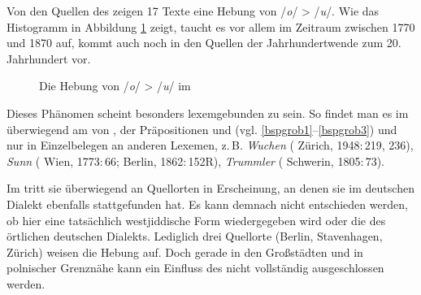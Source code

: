 Von den Quellen des  zeigen 17 Texte eine Hebung von /\textit{o}/ > /\textit{u}/. Wie das Histogramm in Abbildung \ref{histoo_u} zeigt, taucht es vor allem im Zeitraum zwischen 1770 und 1870 auf, kommt auch noch in den Quellen der Jahrhundertwende zum 20. Jahrhundert vor. \\

	
\begin{figure}[h!]
	\caption{Die Hebung von /\textit{o}/ > /\textit{u}/ im }
	\label{histoo_u}	
\end{figure}
\FloatBarrier


Dieses Phänomen scheint besonders lexemgebunden zu sein. So findet man es im  überwiegend am  von , der Präpositionen  und  (vgl. \ref{bspgrob1}--\ref{bspgrob3}) und nur in Einzelbelegen an anderen Lexemen, z.\,B. \textit{Wuchen}  ( Zürich, 1948:\,219, 236), \textit{Sunn}  ( Wien, 1773:\,66;  Berlin, 1862:\,152R), \textit{Trummler}  ( Schwerin, 1805:\,73). 

Im  tritt sie überwiegend an Quellorten in Erscheinung, an denen sie im deutschen Dialekt ebenfalls stattgefunden hat. Es kann demnach nicht entschieden werden, ob hier eine tatsächlich westjiddische Form wiedergegeben wird oder die des örtlichen deutschen Dialekts. Lediglich drei Quellorte (Berlin, Stavenhagen, Zürich) weisen die Hebung auf. Doch gerade in den Großstädten und in polnischer Grenznähe kann ein Einfluss des  nicht vollständig ausgeschlossen werden. \\

